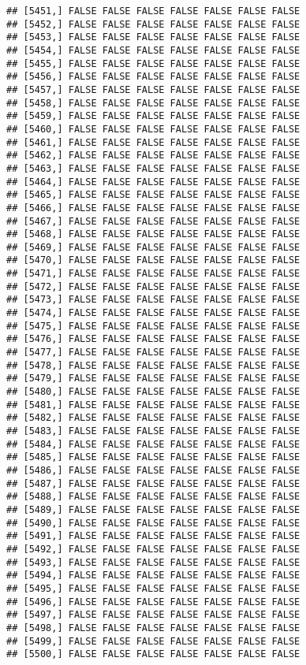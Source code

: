 \documentclass[
]{article}
\begin{document}
\begin{verbatim}
## [5451,] FALSE FALSE FALSE FALSE FALSE FALSE FALSE
## [5452,] FALSE FALSE FALSE FALSE FALSE FALSE FALSE
## [5453,] FALSE FALSE FALSE FALSE FALSE FALSE FALSE
## [5454,] FALSE FALSE FALSE FALSE FALSE FALSE FALSE
## [5455,] FALSE FALSE FALSE FALSE FALSE FALSE FALSE
## [5456,] FALSE FALSE FALSE FALSE FALSE FALSE FALSE
## [5457,] FALSE FALSE FALSE FALSE FALSE FALSE FALSE
## [5458,] FALSE FALSE FALSE FALSE FALSE FALSE FALSE
## [5459,] FALSE FALSE FALSE FALSE FALSE FALSE FALSE
## [5460,] FALSE FALSE FALSE FALSE FALSE FALSE FALSE
## [5461,] FALSE FALSE FALSE FALSE FALSE FALSE FALSE
## [5462,] FALSE FALSE FALSE FALSE FALSE FALSE FALSE
## [5463,] FALSE FALSE FALSE FALSE FALSE FALSE FALSE
## [5464,] FALSE FALSE FALSE FALSE FALSE FALSE FALSE
## [5465,] FALSE FALSE FALSE FALSE FALSE FALSE FALSE
## [5466,] FALSE FALSE FALSE FALSE FALSE FALSE FALSE
## [5467,] FALSE FALSE FALSE FALSE FALSE FALSE FALSE
## [5468,] FALSE FALSE FALSE FALSE FALSE FALSE FALSE
## [5469,] FALSE FALSE FALSE FALSE FALSE FALSE FALSE
## [5470,] FALSE FALSE FALSE FALSE FALSE FALSE FALSE
## [5471,] FALSE FALSE FALSE FALSE FALSE FALSE FALSE
## [5472,] FALSE FALSE FALSE FALSE FALSE FALSE FALSE
## [5473,] FALSE FALSE FALSE FALSE FALSE FALSE FALSE
## [5474,] FALSE FALSE FALSE FALSE FALSE FALSE FALSE
## [5475,] FALSE FALSE FALSE FALSE FALSE FALSE FALSE
## [5476,] FALSE FALSE FALSE FALSE FALSE FALSE FALSE
## [5477,] FALSE FALSE FALSE FALSE FALSE FALSE FALSE
## [5478,] FALSE FALSE FALSE FALSE FALSE FALSE FALSE
## [5479,] FALSE FALSE FALSE FALSE FALSE FALSE FALSE
## [5480,] FALSE FALSE FALSE FALSE FALSE FALSE FALSE
## [5481,] FALSE FALSE FALSE FALSE FALSE FALSE FALSE
## [5482,] FALSE FALSE FALSE FALSE FALSE FALSE FALSE
## [5483,] FALSE FALSE FALSE FALSE FALSE FALSE FALSE
## [5484,] FALSE FALSE FALSE FALSE FALSE FALSE FALSE
## [5485,] FALSE FALSE FALSE FALSE FALSE FALSE FALSE
## [5486,] FALSE FALSE FALSE FALSE FALSE FALSE FALSE
## [5487,] FALSE FALSE FALSE FALSE FALSE FALSE FALSE
## [5488,] FALSE FALSE FALSE FALSE FALSE FALSE FALSE
## [5489,] FALSE FALSE FALSE FALSE FALSE FALSE FALSE
## [5490,] FALSE FALSE FALSE FALSE FALSE FALSE FALSE
## [5491,] FALSE FALSE FALSE FALSE FALSE FALSE FALSE
## [5492,] FALSE FALSE FALSE FALSE FALSE FALSE FALSE
## [5493,] FALSE FALSE FALSE FALSE FALSE FALSE FALSE
## [5494,] FALSE FALSE FALSE FALSE FALSE FALSE FALSE
## [5495,] FALSE FALSE FALSE FALSE FALSE FALSE FALSE
## [5496,] FALSE FALSE FALSE FALSE FALSE FALSE FALSE
## [5497,] FALSE FALSE FALSE FALSE FALSE FALSE FALSE
## [5498,] FALSE FALSE FALSE FALSE FALSE FALSE FALSE
## [5499,] FALSE FALSE FALSE FALSE FALSE FALSE FALSE
## [5500,] FALSE FALSE FALSE FALSE FALSE FALSE FALSE

\end{verbatim}
\end{document}

